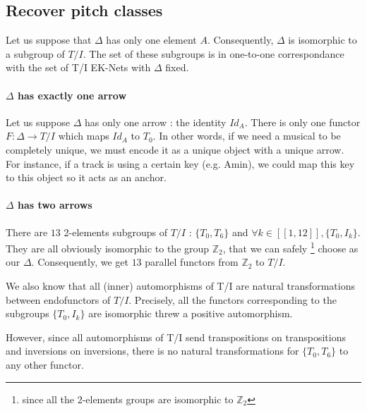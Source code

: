 \documentclass{report}
\begin{document}
\subsection{Recover pitch classes}
Let us suppose that $\Delta$ has only one element $A$. Consequently, $\Delta$ is isomorphic to a subgroup of $T/I$. The set of these subgroups is in one-to-one correspondance with the set of T/I EK-Nets with $\Delta$ fixed.

\paragraph{$\Delta$ has exactly one arrow}
Let us suppose $\Delta$ has only one arrow : the identity $Id_A$. There is only one functor $F:\Delta \rightarrow T/I$ which maps $Id_A$ to $T_0$. In other words, if we need a musical to be completely unique, we must encode it as a unique object with a unique arrow. For instance, if a track is using a certain key (e.g. Amin), we could map this key to this object so it acts as an anchor.


\paragraph{$\Delta$ has two arrows}
There are $13$ 2-elements subgroups of $T/I$ : $\{T_0,T_6\}$ and $\forall k\in[\![1,12]\!], \{T_0,I_k\}$. They are all obviously isomorphic to the group $\mathbb{Z}_2$, that we can safely \footnote{ since all the 2-elements groups are isomorphic to $\mathbb{Z}_2$} choose as our $\Delta$. Consequently, we get $13$ parallel functors from $\mathbb{Z}_2$ to $T/I$.

We also know that all (inner) automorphisms of T/I are natural transformations between endofunctors of $T/I$. Precisely, all the functors corresponding to the subgroups $\{T_0,I_k\}$ are isomorphic threw a positive automorphism.

However, since all automorphisms of T/I send transpositions on transpositions and inversions on inversions, there is no natural transformations for $\{T_0,T_6\}$ to any other functor.
\end{document}
